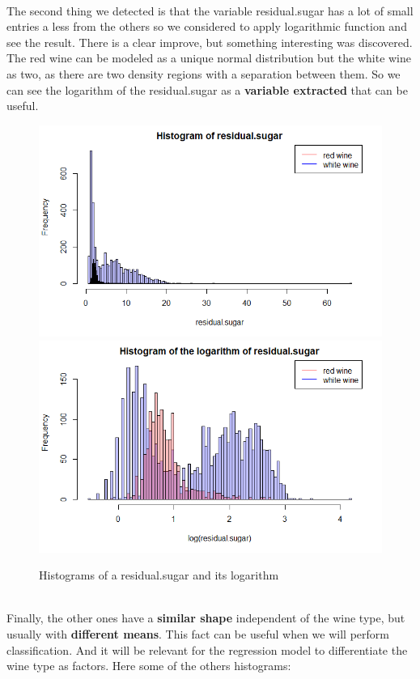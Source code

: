 \documentclass[10pt]{article}
\begin{document}
\ \\
The second thing we detected is that the variable residual.sugar has a lot of small entries a less from the others so we considered to apply logarithmic function and see the result. There is a clear improve, but something interesting was discovered. The red wine can be modeled as a unique normal distribution but the white wine as two, as there are two density regions with a separation between them. So we can see the logarithm of the residual.sugar as a \textbf{variable extracted} that can be useful.
\begin{figure}[H]
\centering
\caption{Histograms of a residual.sugar and its logarithm}
\includegraphics[scale=0.4]{histogram_of_residualsugar}
\includegraphics[scale=0.4]{histogram_of_log_residualsugar}
\end{figure}
\ \\
Finally, the other ones have a \textbf{similar shape} independent of the wine type, but usually with \textbf{different means}. This fact can be useful when we will perform classification. And it will be relevant for the regression model to differentiate the wine type as factors. Here some of the others histograms: \\
\end{document}
